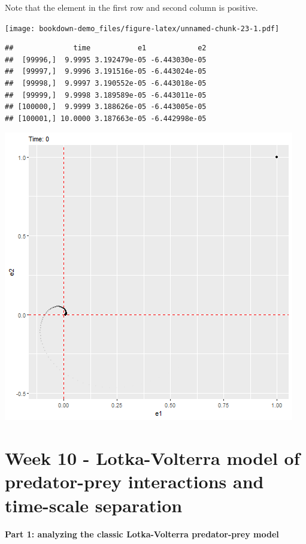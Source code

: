 \documentclass[
]{book}
\begin{document}
Note that the element in the first row and second column is positive.

\texttt{[image: bookdown-demo\_files/figure-latex/unnamed-chunk-23-1.pdf]}

\begin{verbatim}
##              time           e1            e2
##  [99996,]  9.9995 3.192479e-05 -6.443030e-05
##  [99997,]  9.9996 3.191516e-05 -6.443024e-05
##  [99998,]  9.9997 3.190552e-05 -6.443018e-05
##  [99999,]  9.9998 3.189589e-05 -6.443011e-05
## [100000,]  9.9999 3.188626e-05 -6.443005e-05
## [100001,] 10.0000 3.187663e-05 -6.442998e-05
\end{verbatim}

\includegraphics{W9_dynamics_error.gif}

\hypertarget{week-10---lotka-volterra-model-of-predator-prey-interactions-and-time-scale-separation}{%
\chapter*{Week 10 - Lotka-Volterra model of predator-prey interactions and time-scale separation}\label{week-10---lotka-volterra-model-of-predator-prey-interactions-and-time-scale-separation}}

\textbf{Part 1: analyzing the classic Lotka-Volterra predator-prey model}
\end{document}
